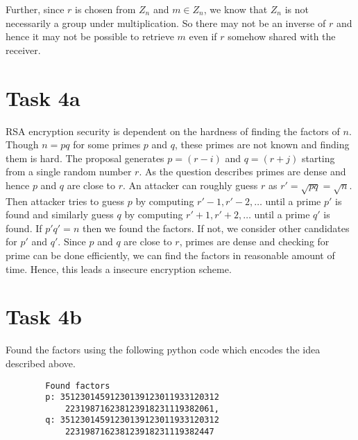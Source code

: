 \documentclass{article}
\begin{document}
    Further, since $r$ is chosen from $Z_n$ and $m \in Z_n$, we know that $Z_n$ is not necessarily a group under multiplication. So there may not be an inverse of $r$ and hence it may not be possible to retrieve $m$ even if $r$ somehow shared with the receiver.

    \section*{Task 4a}
    RSA encryption security is dependent on the hardness of finding the factors of $n$. Though $n = pq$ for some primes $p$ and $q$, these primes are not known and finding them is hard. The proposal generates $p = (r - i)$ and $q = (r + j)$ starting from a single random number $r$. As the question describes primes are dense and hence $p$ and $q$ are close to $r$. An attacker can roughly guess $r$ as $r' = \sqrt{pq} = \sqrt{n}$. Then attacker tries to guess $p$ by computing $r' - 1, r' - 2, \dots$ until a prime $p'$ is found and similarly guess $q$ by computing $r' + 1, r' + 2, \dots$ until a prime $q'$ is found. If $p'q' = n$ then we found the factors. If not, we consider other candidates for $p'$ and $q'$. Since $p$ and $q$ are close to $r$, primes are dense and checking for prime can be done efficiently, we can find the factors in reasonable amount of time. Hence, this leads a insecure encryption scheme.

    \section*{Task 4b}
    Found the factors using the following python code which encodes the idea described above.

    \begin{verbatim}
        Found factors 
        p: 35123014591230139123011933120312
            223198716238123918231119382061,
        q: 35123014591230139123011933120312
            223198716238123918231119382447
    \end{verbatim}
\end{document}

